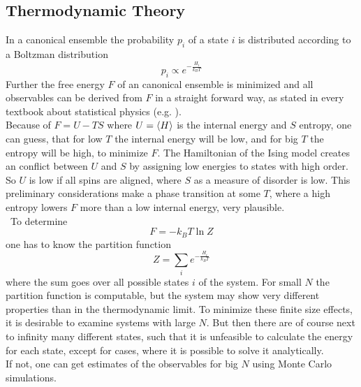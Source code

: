 \subsection{Thermodynamic Theory}
\label{ssec:theory}
    In a canonical ensemble the probability \(p_i\) of a state
    \(i\) is distributed according to a Boltzman distribution
    \[p_i \propto e^{-\frac{H_i}{k_B T}}\]
    Further the free energy \(F\) of an canonical
    ensemble is minimized and all observables can be derived from \(F\)
    in a straight forward way, as stated in every textbook about
    statistical physics (e.g. \cite{nolting2005}).\\
    Because of \(F=U-TS\) where \(U=\left< H \right>\) is the internal energy and
    \(S\) entropy, one can guess, that for low \(T\) the internal energy
    will be low, and for big \(T\) the entropy will be high, to minimize
    \(F\). The Hamiltonian of the Ising model creates an conflict between
    \(U\) and \(S\) by assigning low energies to states with high order.
    So \(U\) is low if all spins are aligned, where \(S\) as a measure of
    disorder is low. This preliminary considerations make a phase
    transition at some \(T\), where a high entropy lowers \(F\) more than
    a low internal energy, very plausible.\\\
    To determine
    \[F=-k_{B}T \ln{Z}\]
    one has to know the partition function
    \[Z=\sum_i e^{-\frac{H_i}{k_{B}T}}\]
    where the sum goes over all possible states \(i\) of the system.
    For small \(N\) the partition function is computable, but the system
    may show very different properties than in the thermodynamic limit.
    To minimize these finite size effects, it is desirable to examine
    systems with large \(N\). But then there are of course next to
    infinity many different states, such that it is unfeasible to
    calculate the energy for each state, except for cases, where it is
    possible to solve it analytically.\\
    If not, one can get estimates of the observables for big \(N\) using
    Monte Carlo simulations.\\


